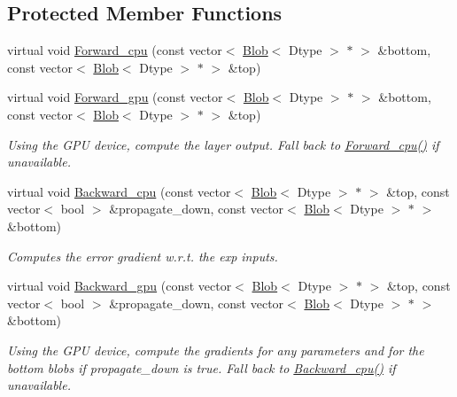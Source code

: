 \subsection*{Protected Member Functions}
\begin{DoxyCompactItemize}
\item 
virtual void \hyperlink{classcaffe_1_1ExpLayer_a56e2e4d6b5bc7eb5d7242f216bd70961}{Forward\+\_\+cpu} (const vector$<$ \hyperlink{classcaffe_1_1Blob}{Blob}$<$ Dtype $>$ $\ast$ $>$ \&bottom, const vector$<$ \hyperlink{classcaffe_1_1Blob}{Blob}$<$ Dtype $>$ $\ast$ $>$ \&top)
\item 
virtual void \hyperlink{classcaffe_1_1ExpLayer_a3d6df27bfdb0aac45f5a7682e0ad7e3f}{Forward\+\_\+gpu} (const vector$<$ \hyperlink{classcaffe_1_1Blob}{Blob}$<$ Dtype $>$ $\ast$ $>$ \&bottom, const vector$<$ \hyperlink{classcaffe_1_1Blob}{Blob}$<$ Dtype $>$ $\ast$ $>$ \&top)\hypertarget{classcaffe_1_1ExpLayer_a3d6df27bfdb0aac45f5a7682e0ad7e3f}{}\label{classcaffe_1_1ExpLayer_a3d6df27bfdb0aac45f5a7682e0ad7e3f}

\begin{DoxyCompactList}\small\item\em Using the G\+PU device, compute the layer output. Fall back to \hyperlink{classcaffe_1_1ExpLayer_a56e2e4d6b5bc7eb5d7242f216bd70961}{Forward\+\_\+cpu()} if unavailable. \end{DoxyCompactList}\item 
virtual void \hyperlink{classcaffe_1_1ExpLayer_a691eeee0b9b2cbd1742e1fde7ba4d941}{Backward\+\_\+cpu} (const vector$<$ \hyperlink{classcaffe_1_1Blob}{Blob}$<$ Dtype $>$ $\ast$ $>$ \&top, const vector$<$ bool $>$ \&propagate\+\_\+down, const vector$<$ \hyperlink{classcaffe_1_1Blob}{Blob}$<$ Dtype $>$ $\ast$ $>$ \&bottom)
\begin{DoxyCompactList}\small\item\em Computes the error gradient w.\+r.\+t. the exp inputs. \end{DoxyCompactList}\item 
virtual void \hyperlink{classcaffe_1_1ExpLayer_a2a1b0a09970aa4998f9f409609ed3712}{Backward\+\_\+gpu} (const vector$<$ \hyperlink{classcaffe_1_1Blob}{Blob}$<$ Dtype $>$ $\ast$ $>$ \&top, const vector$<$ bool $>$ \&propagate\+\_\+down, const vector$<$ \hyperlink{classcaffe_1_1Blob}{Blob}$<$ Dtype $>$ $\ast$ $>$ \&bottom)\hypertarget{classcaffe_1_1ExpLayer_a2a1b0a09970aa4998f9f409609ed3712}{}\label{classcaffe_1_1ExpLayer_a2a1b0a09970aa4998f9f409609ed3712}

\begin{DoxyCompactList}\small\item\em Using the G\+PU device, compute the gradients for any parameters and for the bottom blobs if propagate\+\_\+down is true. Fall back to \hyperlink{classcaffe_1_1ExpLayer_a691eeee0b9b2cbd1742e1fde7ba4d941}{Backward\+\_\+cpu()} if unavailable. \end{DoxyCompactList}\end{DoxyCompactItemize}
